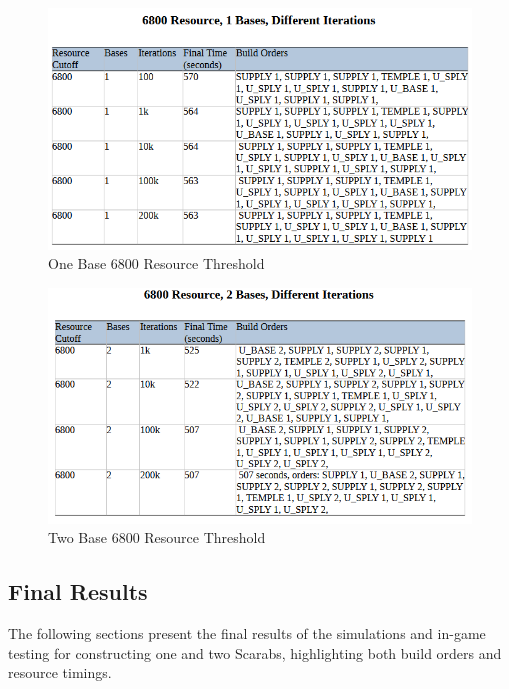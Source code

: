 \documentclass[a4paper, 12pt, english]{article}
\begin{document}
 \begin{figure}[!ht]
 			\begin{center}
				\includegraphics[width=150mm,scale=1.0]{6800r1b.png}
			\end{center}
       		\caption{\label{fig:Lowpass}One Base 6800 Resource Threshold}
 \end{figure}


 \begin{figure}[!ht]
 			\begin{center}
				\includegraphics[width=150mm,scale=1.0]{6800r2b.png}
			\end{center}
       		\caption{\label{fig:Lowpass}Two Base 6800 Resource Threshold}
 \end{figure}


\newpage
\subsection{Final Results}

The following sections present the final results of the simulations and in-game testing for constructing one and two Scarabs, highlighting both build orders and resource timings.
\end{document}
